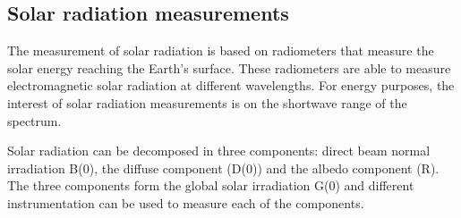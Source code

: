 \subsection{Solar radiation measurements}%

The measurement of solar radiation is based on radiometers that measure the solar energy reaching the Earth's surface. These radiometers are able to measure electromagnetic solar radiation at different wavelengths. For energy purposes, the interest of solar radiation measurements is on the shortwave range of the spectrum.

Solar radiation can be decomposed in three components: direct beam normal irradiation B(0), the diffuse component (D(0)) and the albedo component (R). The three components form the global solar irradiation G(0) and different instrumentation can be used to measure each of the components.




